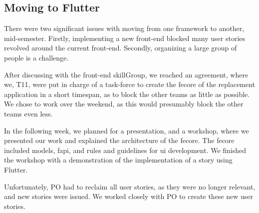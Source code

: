 \subsection{Moving to Flutter} \label{sec:moving-to-flutter}

There were two significant issues with moving from one framework to another, mid-semester. Firstly, implementing a new front-end blocked many user stories revolved around the current front-end. Secondly, organizing a large group of people is a challenge.

After discussing with the front-end \gls{skillGroup}, we reached an agreement, where we, \gls{T11}, were put in charge of a task-force to create the \gls{fecore} of the replacement application in a short timespan, as to block the other teams as little as possible. We chose to work over the weekend, as this would presumably block the other teams even less.

In the following week, we planned for a presentation, and a workshop, where we presented our work and explained the architecture of the \gls{fecore}. The \gls{fecore} included models, \gls{fapi}, and rules and guidelines for \gls{ui} development. We finished the workshop with a demonstration of the implementation of a story using Flutter.

Unfortunately, \gls{PO} had to reclaim all user stories, as they were no longer relevant, and new stories were issued. We worked closely with \gls{PO} to create these new user stories.
